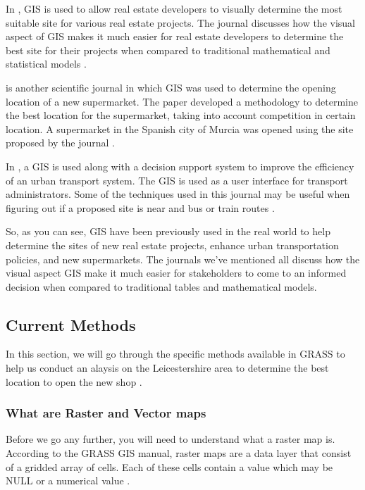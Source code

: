\documentclass[a4paper,11pt,parskip]{scrartcl}
\begin{document}
In , GIS is used to allow real estate developers to visually determine the most
suitable site for various real estate projects. The journal discusses how the visual aspect of GIS makes it
much easier for real estate developers to determine the best site for their projects when compared to traditional mathematical
and statistical models \parencite{realEstateSelection}.

 is another scientific journal in which GIS was used to determine the opening location
of a new supermarket. The paper developed a methodology to determine the best location for the supermarket, taking
into account competition in certain location. A supermarket in the Spanish city of Murcia was opened using the
site proposed by the journal \parencite{retailSiteLocation}.

In , a GIS is used along with a decision support system to improve the efficiency
of an urban transport system. The GIS is used as a user interface for transport administrators. Some of the techniques
used in this journal may be useful when figuring out if a proposed site is near and bus or train routes \parencite{urbanTransportationSelection}.

So, as you can see, GIS have been previously used in the real world to help determine the sites of new real estate
projects, enhance urban transportation policies, and new supermarkets. The journals we've mentioned all discuss
how the visual aspect GIS make it much easier for stakeholders to come to an informed decision when compared to
traditional tables and mathematical models.

\subsection{Current Methods}
In this section, we will go through the specific methods available in GRASS to help us conduct an alaysis on
the Leicestershire area to determine the best location to open the new shop \parencite{manualBuffer}.

\subsubsection{What are Raster and Vector maps}

Before we go any further, you will need to understand what a raster map is. According to the GRASS GIS manual,
raster maps are a data layer that consist of a gridded array of cells. Each of these cells contain a value
which may be NULL or a numerical value \parencite{manualRasterIntro}.
\end{document}
